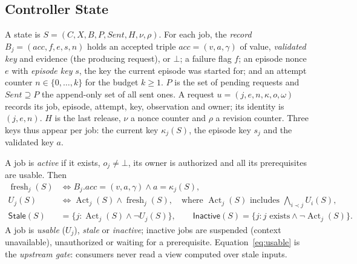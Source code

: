 \documentclass[pdflatex,sn-mathphys-num]{sn-jnl}
\theoremstyle{thmstyleone}%
\theoremstyle{thmstyletwo}%
\theoremstyle{thmstylethree}%
\newcommand{\key}{\kappa}
\newcommand{\fresh}{\operatorname{fresh}}
\newcommand{\Act}{\operatorname{Act}}
\newcommand{\Stale}{\mathsf{Stale}}
\newcommand{\Inact}{\mathsf{Inactive}}
\newcommand{\Sent}{\mathit{Sent}}
\newcommand{\nodata}{\bot}
\begin{document}
\subsection{Controller State}\label{sec:state}
A state is $S=(C,X,B,P,\Sent,H,\nu,\rho)$. For each job, the \emph{record} $B_j=(\mathit{acc},f,e,s,n)$ holds an accepted triple $\mathit{acc}=(v,a,\gamma)$ of value, \emph{validated key} and evidence (the producing request), or $\bot$; a failure flag $f$; an episode nonce $e$ with \emph{episode key} $s$, the key the current episode was started for; and an attempt counter $n\in\{0,\ldots,k\}$ for the budget $k\ge1$. $P$ is the set of pending requests and $\Sent\supseteq P$ the append-only set of all sent ones. A request $u=(j,e,n,\key,o,\omega)$ records its job, episode, attempt, key, observation and owner; its identity is $(j,e,n)$. $H$ is the last release, $\nu$ a nonce counter and $\rho$ a revision counter. Three keys thus appear per job: the current key $\key_j(S)$, the episode key $s_j$ and the validated key $a$.

A job is \emph{active} if it exists, $o_j\neq\nodata$, its owner is authorized and all its prerequisites are usable. Then
\begin{align}
\fresh_j(S)&\iff B_j.\mathit{acc}=(v,a,\gamma)\land a=\key_j(S),\label{eq:fresh}\\
U_j(S)&\iff \Act_j(S)\land\fresh_j(S),\quad\text{where }\Act_j(S)\text{ includes }\textstyle\bigwedge_{i\prec j}U_i(S),\label{eq:usable}\\
\Stale(S)&=\{j:\Act_j(S)\land\neg U_j(S)\},\qquad \Inact(S)=\{j:j\text{ exists}\land\neg\Act_j(S)\}.\label{eq:obl}
\end{align}
A job is \emph{usable} ($U_j$), \emph{stale} or \emph{inactive}; inactive jobs are suspended (context unavailable), unauthorized or waiting for a prerequisite. Equation~\eqref{eq:usable} is the \emph{upstream gate}: consumers never read a view computed over stale inputs.
\end{document}
